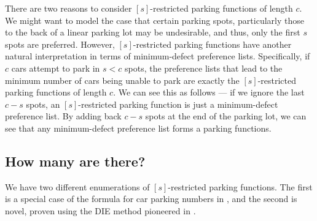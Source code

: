 \documentclass[12 pt]{amsart}
\theoremstyle{definition} %
\theoremstyle{remark} %
\begin{document}
There are two reasons to consider $[s]$-restricted parking functions of length $c$. We might want to model the case that certain parking spots, particularly those to the back of a linear parking lot may be undesirable, and thus, only the first $s$ spots are preferred. However, $[s]$-restricted parking functions have another natural interpretation in terms of minimum-defect preference lists. Specifically, if $c$ cars attempt to park in $s < c$ spots, the preference lists that lead to the minimum number of cars being unable to park are exactly the $[s]$-restricted parking functions of length $c$. We can see this as follows --- if we ignore the last $c - s$ spots, an $[s]$-restricted parking function is just a minimum-defect preference list. By adding back $c - s$ spots at the end of the parking lot, we can see that any minimum-defect preference list forms a parking functions.

\subsection{How many are there?}

We have two different enumerations of $[s]$-restricted parking functions. The first is a special case of the formula for car parking numbers in \cite{cameron-johannsen-prellberg-schweitzer-2008}, and the second is novel, proven using the DIE method pioneered in \cite{benjamin-quinn-2008}.

\resPFcount*
\end{document}
